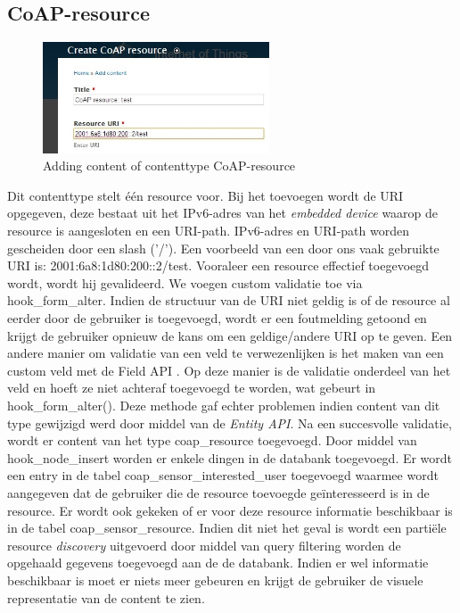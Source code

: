 \subsection{CoAP-resource}
\begin{figure}
\vspace{-10pt}
\centering
\label{fig:addCoapResource}
\includegraphics[width=0.6\textwidth]{fig/add_coap_resource}
\vspace{-20pt}
\centering
\caption{Adding content of contenttype CoAP-resource}
\centering
\vspace{-10pt}
\end{figure}
Dit contenttype stelt \'{e}\'{e}n resource voor. Bij het toevoegen wordt de URI opgegeven, deze bestaat uit het IPv6-adres van het \textit{embedded device} waarop de resource is aangesloten en een URI-path. IPv6-adres en URI-path worden gescheiden door een slash ('/'). Een voorbeeld van een door ons vaak gebruikte URI is: 2001:6a8:1d80:200::2/test. Vooraleer een resource effectief toegevoegd wordt, wordt hij gevalideerd. We voegen custom validatie toe via hook\_form\_alter. Indien de structuur van de URI niet geldig is of de resource al eerder door de gebruiker is toegevoegd, wordt er een foutmelding getoond en krijgt de gebruiker opnieuw de kans om een geldige/andere URI op te geven. Een andere manier om validatie van een veld te verwezenlijken is het maken van een custom veld met de Field API \cite{fieldAPI}. Op deze manier is de validatie onderdeel van het veld en hoeft ze niet achteraf toegevoegd te worden, wat gebeurt in hook\_form\_alter(). Deze methode gaf echter problemen indien content van dit type gewijzigd werd door middel van de \textit{Entity API}. Na een succesvolle validatie, wordt er content van het type coap\_resource toegevoegd. Door middel van hook\_node\_insert worden er enkele dingen in de databank toegevoegd. Er wordt een entry in de tabel coap\_sensor\_interested\_user toegevoegd waarmee wordt aangegeven dat de gebruiker die de resource toevoegde ge\"{i}nteresseerd is in de resource. Er wordt ook gekeken of er voor deze resource informatie beschikbaar is in de tabel coap\_sensor\_resource. Indien dit niet het geval is wordt een parti\"{e}le resource \textit{discovery} uitgevoerd door middel van query filtering worden de opgehaald gegevens toegevoegd aan de de databank. Indien er wel informatie beschikbaar is moet er niets meer gebeuren en krijgt de gebruiker de visuele representatie van de content te zien.\\

